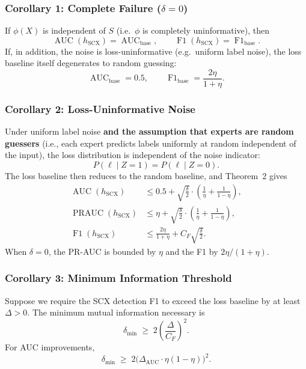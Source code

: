\subsubsection*{Corollary 1: Complete Failure ($\delta = 0$)}
\label{cor:complete-failure}
If $\phi(X)$ is independent of $S$ (i.e.\ $\phi$ is completely uninformative),
then
\[
\operatorname{AUC}(h_{\text{SCX}}) = \operatorname{AUC}_{\text{base}},\qquad
\operatorname{F1}(h_{\text{SCX}}) = \operatorname{F1}_{\text{base}}.
\]
If, in addition, the noise is loss-uninformative (e.g.\ uniform label noise),
the loss baseline itself degenerates to random guessing:
\[
\operatorname{AUC}_{\text{base}} = 0.5,\qquad
\operatorname{F1}_{\text{base}} = \frac{2\eta}{1+\eta}.
\]

\subsubsection*{Corollary 2: Loss-Uninformative Noise}
\label{cor:loss-uninformative}
Under uniform label noise \textbf{and the assumption that experts are random
guessers} (i.e., each expert predicts labels uniformly at random independent
of the input), the loss distribution is independent of the noise
indicator:
\[
P(\ell \mid Z=1) = P(\ell \mid Z=0).
\]
The loss baseline then reduces to the random baseline, and Theorem~2 gives
\begin{align}
\operatorname{AUC}(h_{\text{SCX}}) &\leq 0.5 +
\sqrt{\frac{\delta}{2}}\cdot\left(\frac{1}{\eta} + \frac{1}{1-\eta}\right),
\label{eq:cor2-auc} \\
\operatorname{PRAUC}(h_{\text{SCX}}) &\leq \eta +
\sqrt{\frac{\delta}{2}}\cdot\left(\frac{1}{\eta} + \frac{1}{1-\eta}\right),
\label{eq:cor2-prauc} \\
\operatorname{F1}(h_{\text{SCX}}) &\leq \frac{2\eta}{1+\eta} +
C_F\sqrt{\frac{\delta}{2}}.
\label{eq:cor2-f1}
\end{align}
When $\delta = 0$, the PR-AUC is bounded by $\eta$ and the F1 by
$2\eta/(1+\eta)$.

\subsubsection*{Corollary 3: Minimum Information Threshold}
\label{cor:min-info}
Suppose we require the SCX detection F1 to exceed the loss baseline by at
least $\Delta > 0$. The minimum mutual information necessary is
\begin{equation}
\delta_{\min} \;\geq\; 2\left(\frac{\Delta}{C_F}\right)^2.
\label{eq:min-info-f1}
\end{equation}
For AUC improvements,
\begin{equation}
\delta_{\min} \;\geq\; 2\bigl(\Delta_{\text{AUC}} \cdot \eta(1-\eta)\bigr)^2.
\label{eq:min-info-auc}
\end{equation}

